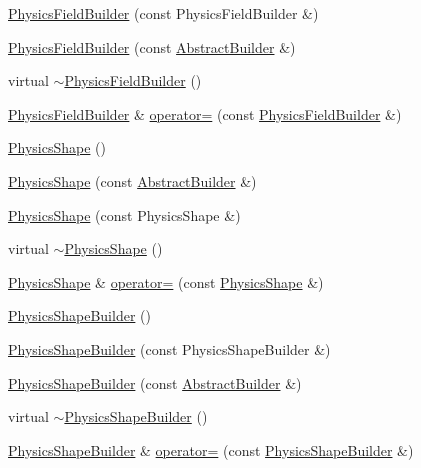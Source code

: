 \begin{DoxyCompactItemize}
\hyperlink{namespacejli_a39d15433c9d678a3a3c08b94e29460f0}{Physics\+Field\+Builder} (const Physics\+Field\+Builder \&)
\item 
\hyperlink{namespacejli_acc1e7447340e93ed56fa2d461b7364fb}{Physics\+Field\+Builder} (const \hyperlink{classjli_1_1_abstract_builder}{Abstract\+Builder} \&)
\item 
virtual \hyperlink{namespacejli_a1e88f936038ad9dcf194653553aaa9d6}{$\sim$\+Physics\+Field\+Builder} ()
\item 
\hyperlink{namespacejli_a3993b3872eea01dec1c9bd07bb35aae8}{Physics\+Field\+Builder} \& \hyperlink{namespacejli_a8eb5ca2da7648ae789063468ec4d5b1c}{operator=} (const \hyperlink{namespacejli_a3993b3872eea01dec1c9bd07bb35aae8}{Physics\+Field\+Builder} \&)
\item 
\hyperlink{namespacejli_a5d762365fd3979a5b8f4eebe8a916892}{Physics\+Shape} ()
\item 
\hyperlink{namespacejli_a2c1e26825311f621ee078252a29461ca}{Physics\+Shape} (const \hyperlink{classjli_1_1_abstract_builder}{Abstract\+Builder} \&)
\item 
\hyperlink{namespacejli_a972bcb3073388c79c38278a37c0fba83}{Physics\+Shape} (const Physics\+Shape \&)
\item 
virtual \hyperlink{namespacejli_afd6ccdd598deb11b40538c5fad1b5477}{$\sim$\+Physics\+Shape} ()
\item 
\hyperlink{namespacejli_a5d762365fd3979a5b8f4eebe8a916892}{Physics\+Shape} \& \hyperlink{namespacejli_a7e2664c542fe138299889c24fca38c7e}{operator=} (const \hyperlink{namespacejli_a5d762365fd3979a5b8f4eebe8a916892}{Physics\+Shape} \&)
\item 
\hyperlink{namespacejli_a24992ac1c3858db95ba078eac205adc7}{Physics\+Shape\+Builder} ()
\item 
\hyperlink{namespacejli_af8521f0e610100e574ceb1c001582b5a}{Physics\+Shape\+Builder} (const Physics\+Shape\+Builder \&)
\item 
\hyperlink{namespacejli_a7506589a40ec7b7bd1b48d258fdc1330}{Physics\+Shape\+Builder} (const \hyperlink{classjli_1_1_abstract_builder}{Abstract\+Builder} \&)
\item 
virtual \hyperlink{namespacejli_ae1e0786ad4fd198909d0c1c625a624cc}{$\sim$\+Physics\+Shape\+Builder} ()
\item 
\hyperlink{namespacejli_a24992ac1c3858db95ba078eac205adc7}{Physics\+Shape\+Builder} \& \hyperlink{namespacejli_af6d5c0ddeeb0d245763a8bdccf963738}{operator=} (const \hyperlink{namespacejli_a24992ac1c3858db95ba078eac205adc7}{Physics\+Shape\+Builder} \&)

\end{DoxyCompactItemize}

